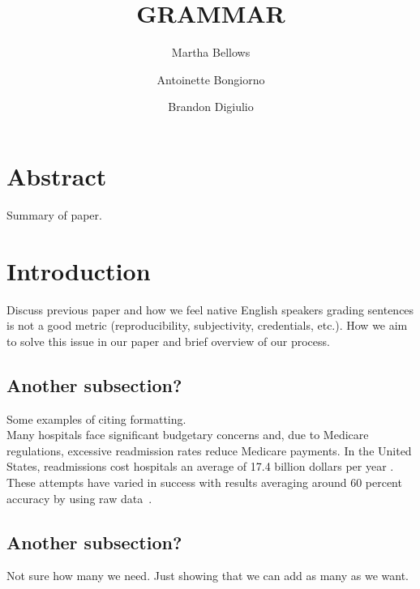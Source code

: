 \documentclass[12pt,a4paper]{article}
\title{GRAMMAR}
\author{
        Martha Bellows 
\and
        Antoinette Bongiorno
\and 
	Brandon Digiulio
}
\begin{document}
\maketitle

\section{Abstract}
Summary of paper. 

\pagebreak

\section{Introduction}
Discuss previous paper and how we feel native English speakers grading sentences is not a good metric (reproducibility, subjectivity, credentials, etc.). How we aim to solve this issue in our paper and brief overview of our process.


\subsection{Another subsection?}
Some examples of citing formatting.\\

Many hospitals face significant budgetary concerns and, due to Medicare regulations, excessive readmission rates reduce Medicare payments. In the United States, readmissions cost hospitals an average of 17.4 billion dollars per year \cite{catlin2008}. These attempts have varied in success with results averaging around 60 percent accuracy by using raw data~\cite{kansagara2011}. 

\subsection{Another subsection?}
Not sure how many we need. Just showing that we can add as many as we want.
\end{document}
